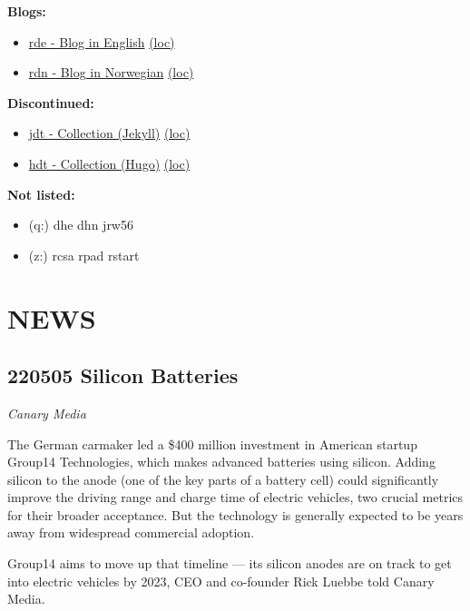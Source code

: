 \documentclass[
]{book}
\providecommand{\tightlist}{%
  \setlength{\itemsep}{0pt}\setlength{\parskip}{0pt}}
\begin{document}
\textbf{Blogs:}

\begin{itemize}
\tightlist
\item
  \href{https://dyrehaugen.github.io/rde}{rde - Blog in English} \href{http://localhost/rde}{(loc)}
\item
  \href{https://dyrehaugen.github.io/rdn}{rdn - Blog in Norwegian} \href{http://localhost/rdn}{(loc)}
\end{itemize}

\textbf{Discontinued:}

\begin{itemize}
\tightlist
\item
  \href{https://dyrehaugen.github.io/jdt}{jdt - Collection (Jekyll)} \href{http://localhost/jdt}{(loc)}
\item
  \href{https://dyrehaugen.github.io/hdt}{hdt - Collection (Hugo)} \href{http://localhost/hdt}{(loc)}
\end{itemize}

\textbf{Not listed:}

\begin{itemize}
\tightlist
\item
  (q:) dhe dhn jrw56
\item
  (z:) rcsa rpad rstart
\end{itemize}

\hypertarget{news}{%
\chapter{NEWS}\label{news}}

\hypertarget{silicon-batteries}{%
\section{220505 Silicon Batteries}\label{silicon-batteries}}

\emph{Canary Media}

The German carmaker led a \$400 million investment in American startup Group14 Technologies, which makes advanced batteries using silicon. Adding silicon to the anode (one of the key parts of a battery cell) could significantly improve the driving range and charge time of electric vehicles, two crucial metrics for their broader acceptance. But the technology is generally expected to be years away from widespread commercial adoption.

Group14 aims to move up that timeline --- its silicon anodes are on track to get into electric vehicles by 2023, CEO and co-founder Rick Luebbe told Canary Media.
\end{document}
